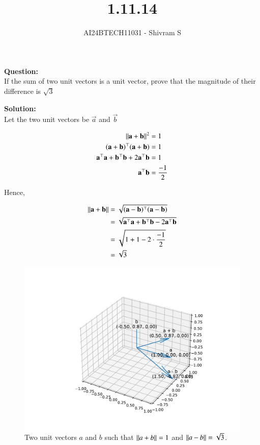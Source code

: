 \documentclass[journal]{IEEEtran}
\begin{document}

\vspace{3cm}

\title{1.11.14}
\author{AI24BTECH11031 - Shivram S
}
{\let\newpage\relax\maketitle}

\renewcommand{\thefigure}{\theenumi}
\renewcommand{\thetable}{\theenumi}
\setlength{\intextsep}{10pt} %


\renewcommand{\thetable}{\theenumi}


\textbf{Question: }\\
If the sum of two unit vectors is a unit vector, prove that the magnitude of their difference
is $\sqrt 3$

\textbf{Solution: } \\
Let the two unit vectors be $\vec{a}$ and $\vec{b}$

\begin{align}
    \left\lVert\mathbf{a} + \mathbf{b}\right\rVert^2 &= 1 \\
    (\mathbf{a}+\mathbf{b})^\top(\mathbf{a}+\mathbf{b}) &= 1 \\
    \mathbf{a}^\top\mathbf{a} + \mathbf{b}^\top\mathbf{b} + 2\mathbf{a}^\top\mathbf{b} &= 1 \\
    \mathbf{a}^\top\mathbf{b} &= \frac{-1}{2}
\end{align}

Hence,

\begin{align}
    \left\lVert\mathbf{a} + \mathbf{b}\right\rVert &= \sqrt{(\mathbf{a}-\mathbf{b})^\top(\mathbf{a}-\mathbf{b})} \\
    &= \sqrt{\mathbf{a}^\top\mathbf{a} + \mathbf{b}^\top\mathbf{b} - 2\mathbf{a}^\top\mathbf{b}} \\
    &= \sqrt{1 + 1 - 2 \cdot \frac{-1}{2}} \\
    &= \sqrt{3}
\end{align}

\begin{figure}[h!]
    \centering
    \includegraphics[width=0.7\linewidth]{figs/fig.pdf}
    \caption{Two unit vectors $a$ and $b$ such that $\left\lVert a+b\right\rVert = 1$ and $\left\lVert a-b\right\rVert=\sqrt{3}$.}
\end{figure}
\end{document}
